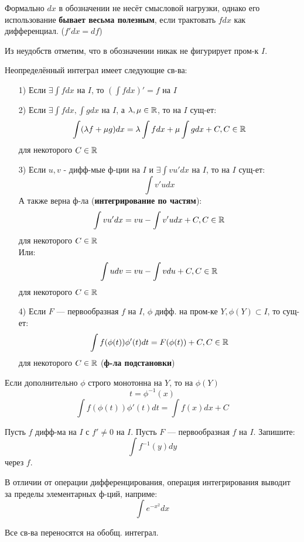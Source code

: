 \begin{note}
  Формально $dx$ в обозначении не несёт смысловой нагрузки, однако его использование \textbf{бывает весьма полезным}, если трактовать $f dx$ как дифференциал. ($f' dx = df$)
\end{note} 
\begin{note}
Из неудобств отметим, что в обозначении никак не фигурирует пром-к $I$.
\end{note}
\begin{statement}
Неопределённый интеграл имеет следующие св-ва:
\begin{itemize}
  \item [1) ] Если $\exists \int f dx$ на $I$, то $\left(\int f dx\right)' = f$ на $I$
  \item [2) ] Если $\exists \int f dx, \int g dx$ на $I$, а $\lambda, \mu \in \mathbb{R}$, то на $I$ сущ-ет:
    \[
    \int (\lambda f + \mu g) dx = \lambda \int f dx + \mu \int g dx + C, C \in \mathbb{R}
    \]
    для некоторого $C \in \mathbb{R}$ \\
  \item [3) ] Если $u, v$ - дифф-мые ф-ции на $I$ и $\exists \int vu' dx$ на $I$, то на $I$ сущ-ет:
    \[
      \int v'u dx
    \]
    А также верна ф-ла (\textbf{интегрирование по частям}):
    \[
      \int vu' dx = vu - \int v'u dx + C, C \in \mathbb{R}
    \]
    для некоторого $C \in \mathbb{R}$ \\
    Или:
    \[
    \int u dv = vu - \int v du + C, C \in \mathbb{R}
    \]
    для некоторого $C \in \mathbb{R}$ \\
  \item [4) ] Если $F$ --- первообразная $f$ на $I$, $\phi$ дифф. на пром-ке $Y, \phi(Y) \subset I$, то сущ-ет:
    \[
    \int f(\phi(t)) \phi'(t) dt = F(\phi(t)) + C, C \in \mathbb{R}
    \]
    для некоторого $C \in \mathbb{R}$ (\textbf{ф-ла подстановки}) \\
\end{itemize} 
\end{statement}
\begin{note}
Если дополнительно $\phi$ строго монотонна на $Y$, то на $\phi(Y)$
\[
t = \phi^{-1}(x)
\]
\[
    \int f(\phi(t)) \phi'(t) dt = \int f(x) dx + C 
\]
\end{note}
\begin{task}
Пусть $f$ дифф-ма на $I$ с $f' \neq 0$ на $I$. Пусть $F$ --- первообразная $f$ на $I$. Запишите:
\[
\int f^{-1}(y) dy
\]
через $f$.
\end{task}
\begin{note}
 В отличии от операции дифференцирования, операция интегрирования выводит за пределы элементарных ф-ций, наприме:
 \[
  \int e^{-x^{2}} dx
 \]
\end{note}
\begin{note}
Все св-ва переносятся на обобщ. интеграл.
\end{note}
